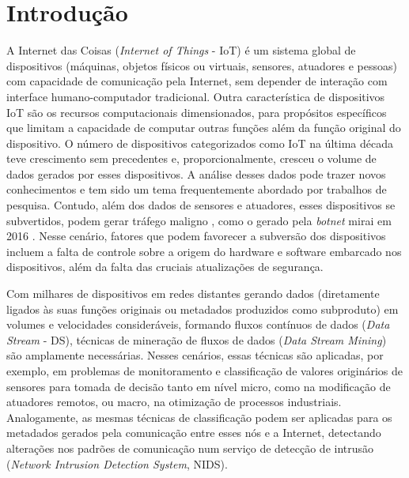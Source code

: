\chapter{Introdução}\label{cha:intro}

\newcommand{\iot}{IoT\xspace}

A Internet das Coisas (\emph{Internet of Things} - IoT) é um sistema global de
dispositivos (máquinas, objetos físicos ou virtuais, sensores, atuadores e
pessoas) com capacidade de comunicação pela Internet, sem depender de
interação com interface humano-computador tradicional.
Outra característica de dispositivos \iot são os 
recursos computacionais dimensionados,
para
propósitos específicos que limitam a capacidade de computar outras funções além
da função original do dispositivo.
O número de dispositivos categorizados como IoT na última década teve
crescimento sem precedentes e, proporcionalmente, cresceu o volume de dados
gerados por esses dispositivos.
A análise desses dados pode trazer novos conhecimentos e tem sido um tema frequentemente
abordado por trabalhos de pesquisa.
Contudo, além dos dados de sensores e atuadores, esses dispositivos se subvertidos,
podem gerar tráfego maligno
, como o gerado pela
\emph{botnet} mirai em 2016 \cite{Kambourakis2017}.
Nesse cenário, fatores que podem favorecer a subversão dos dispositivos incluem a
falta de controle sobre a origem do hardware e software embarcado nos
dispositivos, além da falta das cruciais atualizações de segurança.


\newcommand{\ds}{DS\xspace}

Com milhares de dispositivos em redes distantes gerando dados (diretamente
ligados às suas funções originais ou metadados produzidos como subproduto) em
volumes e velocidades consideráveis, formando fluxos contínuos de dados (\emph{Data
Stream} - DS), técnicas de mineração de fluxos de dados
(\emph{Data Stream Mining}) são amplamente necessárias.
Nesses cenários, essas técnicas são
aplicadas, por exemplo, em problemas de monitoramento e classificação de valores
originários de sensores para tomada de decisão tanto em nível micro, como na
modificação de atuadores remotos, ou macro, na otimização de processos
industriais.
Analogamente, as mesmas técnicas de classificação podem ser aplicadas para os
metadados gerados pela comunicação entre esses nós e a Internet, detectando
alterações nos padrões de comunicação num serviço de detecção de intrusão
(\emph{Network Intrusion Detection System}, NIDS).

